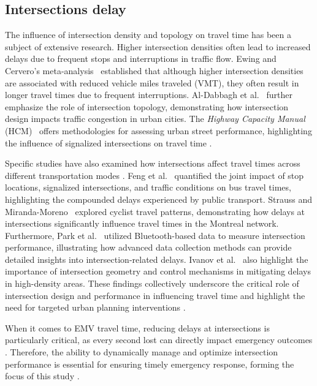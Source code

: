 \subsection{Intersections delay}\label{subsec:intersection_delay}
The influence of intersection density and topology on travel time has been a subject of extensive research. Higher intersection densities often lead to increased delays due to frequent stops and interruptions in traffic flow. Ewing and Cervero's meta-analysis~\cite{EwingCervero2010} established that although higher intersection densities are associated with reduced vehicle miles traveled (VMT), they often result in longer travel times due to frequent interruptions. Al-Dabbagh et al.~\cite{al2019impact} further emphasize the role of intersection topology, demonstrating how intersection design impacts traffic congestion in urban cities. The \textit{Highway Capacity Manual} (HCM)~\cite{HCM2010} offers methodologies for assessing urban street performance, highlighting the influence of signalized intersections on travel time \cite{liu2022retrieval}. 

Specific studies have also examined how intersections affect travel times across different transportation modes \cite{liu2022graph,chen2022exploring,you2022momentum}. Feng et al.~\cite{feng2015quantifying} quantified the joint impact of stop locations, signalized intersections, and traffic conditions on bus travel times, highlighting the compounded delays experienced by public transport. Strauss and Miranda-Moreno~\cite{strauss2017speed} explored cyclist travel patterns, demonstrating how delays at intersections significantly influence travel times in the Montreal network. Furthermore, Park et al.~\cite{park2016measuring} utilized Bluetooth-based data to measure intersection performance, illustrating how advanced data collection methods can provide detailed insights into intersection-related delays. Ivanov et al.~\cite{AssessingTrafficCapacity2022} also highlight the importance of intersection geometry and control mechanisms in mitigating delays in high-density areas. These findings collectively underscore the critical role of intersection design and performance in influencing travel time and highlight the need for targeted urban planning interventions \cite{han2023diffeomorphic,yan2023representation,chen2023bridge}. 

When it comes to EMV travel time, reducing delays at intersections is particularly critical, as every second lost can directly impact emergency outcomes \cite{dong2022multi,you2022incremental,dong2022flow}. Therefore, the ability to dynamically manage and optimize intersection performance is essential for ensuring timely emergency response, forming the focus of this study \cite{sun2023hybrid,liu2023llmrec,cao2023multi}.

